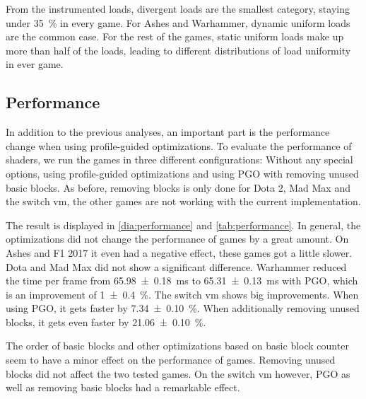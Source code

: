 From the instrumented loads, divergent loads are the smallest category, staying under \SI{35}{\percent} in every game.
For Ashes and Warhammer, dynamic uniform loads are the common case. For the rest of the games, static uniform loads make up more than half of the loads, leading to different distributions of load uniformity in ever game.

\subsection{Performance}
\label{sub:eval_perf}
In addition to the previous analyses, an important part is the performance change when using profile-guided optimizations.
To evaluate the performance of shaders, we run the games in three different configurations: Without any special options, using profile-guided optimizations and using PGO with removing unused basic blocks.
As before, removing blocks is only done for Dota 2, Mad Max and the switch vm, the other games are not working with the current implementation.


\begin{table}
	\centering
	\label{tab:performance}
\end{table}

The result is displayed in \cref{dia:performance} and \cref{tab:performance}.
In general, the optimizations did not change the performance of games by a great amount.
On Ashes and F1 2017 it even had a negative effect, these games got a little slower.
Dota and Mad Max did not show a significant difference.
Warhammer reduced the time per frame from \SI{65.98 \pm 0.18}{\milli\second} to \SI{65.31 \pm 0.13}{\milli\second} with PGO, which is an improvement of \SI{1 \pm 0.4}{\percent}.
The switch vm shows big improvements. When using PGO, it gets faster by \SI{7.34 \pm 0.10}{\percent}.
When additionally removing unused blocks, it gets even faster by \SI{21.06 \pm 0.10}{\percent}.

The order of basic blocks and other optimizations based on basic block counter seem to have a minor effect on the performance of games.
Removing unused blocks did not affect the two tested games.
On the switch vm however, PGO as well as removing basic blocks had a remarkable effect.


